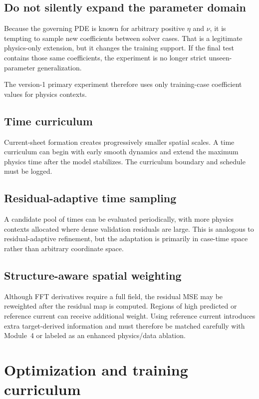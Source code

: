 \documentclass[11pt]{article}
\begin{document}
\subsection{Do not silently expand the parameter domain}
Because the governing PDE is known for arbitrary positive $\eta$ and $\nu$, it is tempting to sample new coefficients between solver cases. That is a legitimate physics-only extension, but it changes the training support. If the final test contains those same coefficients, the experiment is no longer strict unseen-parameter generalization.

The version-1 primary experiment therefore uses only training-case coefficient values for physics contexts.

\subsection{Time curriculum}
Current-sheet formation creates progressively smaller spatial scales. A time curriculum can begin with early smooth dynamics and extend the maximum physics time after the model stabilizes. The curriculum boundary and schedule must be logged.

\subsection{Residual-adaptive time sampling}
A candidate pool of times can be evaluated periodically, with more physics contexts allocated where dense validation residuals are large. This is analogous to residual-adaptive refinement, but the adaptation is primarily in case-time space rather than arbitrary coordinate space.

\subsection{Structure-aware spatial weighting}
Although FFT derivatives require a full field, the residual MSE may be reweighted after the residual map is computed. Regions of high predicted or reference current can receive additional weight. Using reference current introduces extra target-derived information and must therefore be matched carefully with Module~4 or labeled as an enhanced physics/data ablation.

\section{Optimization and training curriculum}
\label{sec:training}
\end{document}
